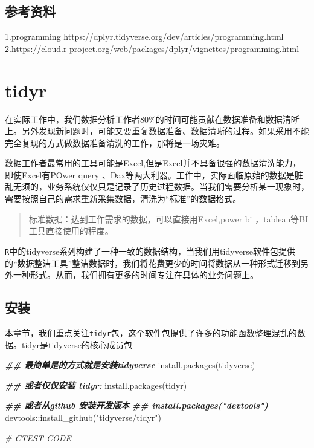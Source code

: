 \documentclass[
]{book}
\newenvironment{Shaded}{\begin{snugshade}}{\end{snugshade}}
\newcommand{\CommentTok}[1]{\textcolor[rgb]{0.56,0.35,0.01}{\textit{#1}}}
\newcommand{\DocumentationTok}[1]{\textcolor[rgb]{0.56,0.35,0.01}{\textbf{\textit{#1}}}}
\newcommand{\FunctionTok}[1]{\textcolor[rgb]{0.00,0.00,0.00}{#1}}
\newcommand{\NormalTok}[1]{#1}
\newcommand{\SpecialCharTok}[1]{\textcolor[rgb]{0.00,0.00,0.00}{#1}}
\newcommand{\StringTok}[1]{\textcolor[rgb]{0.31,0.60,0.02}{#1}}
\begin{document}
\hypertarget{ux53c2ux8003ux8d44ux6599}{%
\section{参考资料}\label{ux53c2ux8003ux8d44ux6599}}

1.programming \url{https://dplyr.tidyverse.org/dev/articles/programming.html}
2.https://cloud.r-project.org/web/packages/dplyr/vignettes/programming.html

\hypertarget{tidyr}{%
\chapter{tidyr}\label{tidyr}}

在实际工作中，我们数据分析工作者80\%的时间可能贡献在数据准备和数据清晰上。另外发现新问题时，可能又要重复数据准备、数据清晰的过程。如果采用不能完全复现的方式做数据准备清洗的工作，那将是一场灾难。

数据工作者最常用的工具可能是Excel,但是Excel并不具备很强的数据清洗能力，即使Excel有POwer query 、Dax等两大利器。工作中，实际面临原始的数据是脏乱无须的，业务系统仅仅只是记录了历史过程数据。当我们需要分析某一现象时，需要按照自己的需求重新采集数据，清洗为``标准''的数据格式。

\begin{quote}
标准数据：达到工作需求的数据，可以直接用Excel,power bi ，tableau等BI工具直接使用的程度。
\end{quote}

\texttt{R}中的tidyverse系列构建了一种一致的数据结构，当我们用tidyverse软件包提供的``数据整洁工具''整洁数据时，我们将花费更少的时间将数据从一种形式迁移到另外一种形式。从而，我们拥有更多的时间专注在具体的业务问题上。

\hypertarget{ux5b89ux88c5-1}{%
\section{安装}\label{ux5b89ux88c5-1}}

本章节，我们重点关注\texttt{tidyr}包，这个软件包提供了许多的功能函数整理混乱的数据。tidyr是tidyverse的核心成员包

\begin{Shaded}
\begin{Highlighting}[]
\DocumentationTok{\#\# 最简单是的方式就是安装tidyverse}
\FunctionTok{install.packages}\NormalTok{(}\StringTok{\textquotesingle{}tidyverse\textquotesingle{}}\NormalTok{)}

\DocumentationTok{\#\# 或者仅仅安装 tidyr:}
\FunctionTok{install.packages}\NormalTok{(}\StringTok{\textquotesingle{}tidyr\textquotesingle{}}\NormalTok{)}

\DocumentationTok{\#\# 或者从github 安装开发版本}
\DocumentationTok{\#\# install.packages("devtools")}
\NormalTok{devtools}\SpecialCharTok{::}\FunctionTok{install\_github}\NormalTok{(}\StringTok{"tidyverse/tidyr"}\NormalTok{)}

\CommentTok{\# CTEST CODE}
\end{Highlighting}
\end{Shaded}
\end{document}
